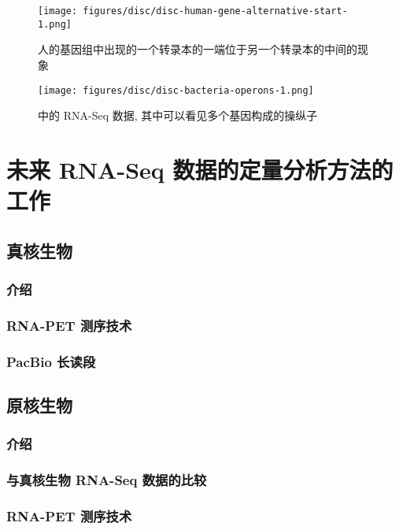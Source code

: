 \begin{figure}[!t]
\centering
\texttt{[image: figures/disc/disc-human-gene-alternative-start-1.png]}
\caption{人的基因组中出现的一个转录本的一端位于另一个转录本的中间的现象}
\label{disc-human-gene-alternative-start-1}
\end{figure}

\begin{figure}[!t]
\centering
\texttt{[image: figures/disc/disc-bacteria-operons-1.png]}
\caption{ 中的 RNA-Seq 数据, 
其中可以看见多个基因构成的操纵子}
\label{disc-bacteria-operons-1}
\end{figure}

\section{未来 RNA-Seq 数据的定量分析方法的工作}

\subsection{真核生物}

\subsubsection{介绍} %

\subsubsection{RNA-PET 测序技术} %

\subsubsection{PacBio 长读段} %

\subsection{原核生物}

\subsubsection{介绍} %

\subsubsection{与真核生物 RNA-Seq 数据的比较} %

\subsubsection{RNA-PET 测序技术} %





